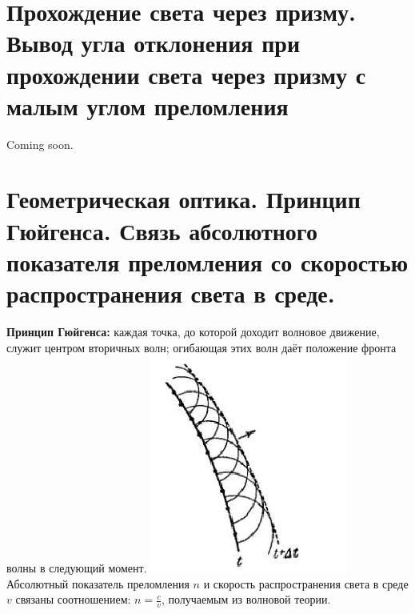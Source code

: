 \documentclass[14pt]{extarticle}
\begin{document}
\section{Прохождение света через призму. Вывод угла отклонения при прохождении света
через призму с малым углом преломления}
Coming soon.
\section{Геометрическая оптика. Принцип Гюйгенса. Связь 
абсолютного показателя
преломления со скоростью распространения света в среде.}

\textbf{Принцип Гюйгенса:} каждая точка, до которой доходит
волновое движение, служит центром вторичных волн; огибающая
этих волн даёт положение фронта волны в следующий момент. 
\includegraphics{wavefront.png}
Абсолютный показатель преломления $n$ и скорость распространения 
света в среде $v$ связаны соотношением: $n = \frac{c}{v}$, 
получаемым из волновой теории.
\\
\end{document}
